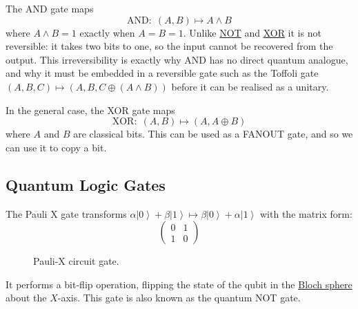 \documentclass{article}
\newcommand{\ket}[1]{\ensuremath{\left|#1\right\rangle}}
\newcounter{definition}[section]
\begin{document}
    \begin{definition}
      \label{def:classical-and}
      The AND gate maps
      \begin{equation}
        \text{AND}: \; (A, B) \mapsto A \wedge B
      \end{equation}
      where $A \wedge B = 1$ exactly when $A = B = 1$. Unlike \hyperref[def:classical-not]{NOT} and \hyperref[def:classical-xor]{XOR} it is not reversible: it takes two bits to one, so the input cannot be recovered from the output. This irreversibility is exactly why AND has no direct quantum analogue, and why it must be embedded in a reversible gate such as the Toffoli gate $(A, B, C) \mapsto (A, B, C \oplus (A \wedge B))$ before it can be realised as a unitary. 
    \end{definition}

    \begin{definition}
      \label{def:classical-xor}
      In the general case, the XOR gate maps
      \begin{equation} 
        \text{XOR}: \; (A, B) \mapsto (A, A \oplus B)
      \end{equation}
      where $A$ and $B$ are classical bits. This can be used as a FANOUT gate, and so we can use it to copy a bit. 
    \end{definition}

  \subsection{Quantum Logic Gates}

    \begin{definition}[Pauli X]
      \label{def:pauli-x}
      The Pauli X gate transforms $\alpha \ket{0} + \beta \ket{1} \mapsto \beta \ket{0} + \alpha \ket{1}$ with the matrix form: 
      \begin{equation} 
        \begin{pmatrix} 0 & 1 \\ 1 & 0 \end{pmatrix}
      \end{equation}
      \begin{figure}[H]
        \centering 
        \caption{Pauli-X circuit gate.} 
        \label{fig:paulix}
      \end{figure}
      It performs a bit-flip operation, flipping the state of the qubit in the \hyperref[def:bloch-sphere]{Bloch sphere} about the $X$-axis. This gate is also known as the quantum NOT gate.
    \end{definition}
\end{document}
